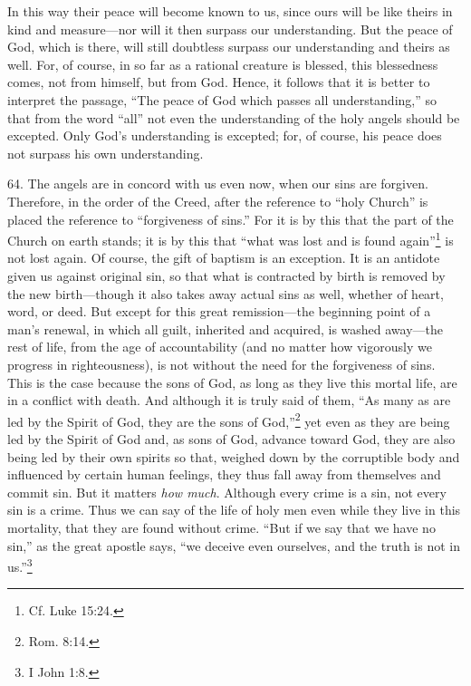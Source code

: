 In this way their peace will become known to us, since ours will be like theirs in kind and measure—nor will it then surpass our understanding. But the peace of God, which is there, will still doubtless surpass our understanding and theirs as well. For, of course, in so far as a rational creature is blessed, this blessedness comes, not from himself, but from God. Hence, it follows that it is better to interpret the passage, ``The peace of God which passes all understanding,'' so that from the word ``all'' not even the understanding of the holy angels should be excepted. Only God's understanding is excepted; for, of course, his peace does not surpass his own understanding.


64. The angels are in concord with us even now, when our sins are forgiven. Therefore, in the order of the Creed, after the reference to ``holy Church'' is placed the reference to ``forgiveness of sins.'' For it is by this that the part of the Church on earth stands; it is by this that ``what was lost and is found again''\footnote{Cf. Luke 15:24.} is not lost again. Of course, the gift of baptism is an exception. It is an antidote given us against original sin, so that what is contracted by birth is removed by the new birth—though it also takes away actual sins as well, whether of heart, word, or deed. But except for this great remission—the beginning point of a man's renewal, in which all guilt, inherited and acquired, is washed away—the rest of life, from the age of accountability (and no matter how vigorously we progress in righteousness), is not without the need for the forgiveness of sins. This is the case because the sons of God, as long as they live this mortal life, are in a conflict with death. And although it is truly said of them, ``As many as are led by the Spirit of God, they are the sons of God,''\footnote{Rom. 8:14.} yet even as they are being led by the Spirit of God and, as sons of God, advance toward God, they are also being led by their own spirits so that, weighed down by the corruptible body and influenced by certain human feelings, they thus fall away from themselves and commit sin. But it matters \emph{how much}. Although every crime is a sin, not every sin is a crime. Thus we can say of the life of holy men even while they live in this mortality, that they are found without crime. ``But if we say that we have no sin,'' as the great apostle says, ``we deceive even ourselves, and the truth is not in us.''\footnote{I John 1:8.}

